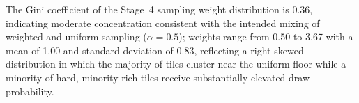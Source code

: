 The Gini coefficient of the Stage~4 sampling weight distribution is 0.36, indicating moderate concentration consistent with the intended mixing of weighted and uniform sampling ($\alpha = 0.5$); weights range from 0.50 to 3.67 with a mean of 1.00 and standard deviation of 0.83, reflecting a right-skewed distribution in which the majority of tiles cluster near the uniform floor while a minority of hard, minority-rich tiles receive substantially elevated draw probability.
